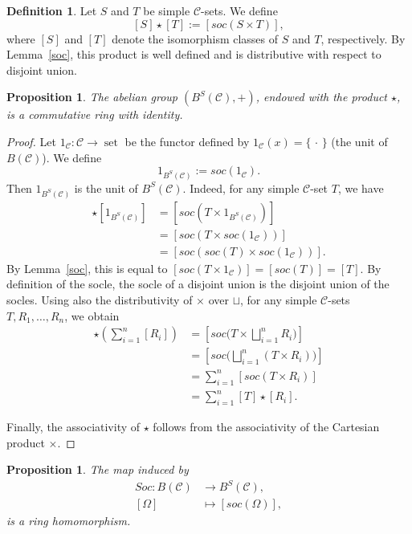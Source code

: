 \documentclass[a4paper]{article}
\newtheorem{prop}[thm]{Proposition}
\theoremstyle{definition}
\newtheorem{defi}[thm]{Definition}
\theoremstyle{remark}
\newcommand*{\cat}[1]{\mathcal{#1}}
\newcommand*{\set}{\operatorname*{set}}
\begin{document}
\begin{defi}
Let $S$ and $T$ be simple $\cat{C}$-sets. We define 
\[
    [S] \star [T] := [soc(S \times T)],
\]
where $[S]$ and $[T]$ denote the isomorphism classes of $S$ and $T$, respectively. By Lemma~\ref{soc}, this product is well defined and is distributive with respect to disjoint union.
\end{defi}
\begin{prop}
The abelian group $(B^{S}(\cat{C}),+)$, endowed with the product $\star$, is a commutative ring with identity.
\end{prop}
\begin{proof}
Let $1_\cat{C} \colon \cat{C} \to \set$ be the functor defined by $1_\cat{C}(x) = \{\, \cdot \,\}$ (the unit of $B(\cat{C})$). We define
\[
    1_{B^S(\cat{C})} := soc(1_\cat{C}).
\]
Then $1_{B^S(\cat{C})}$ is the unit of $B^S(\cat{C})$. Indeed, for any simple $\cat{C}$-set $T$, we have
\begin{align*}
    [T] \star [1_{B^S(\cat{C})}]
    &= [soc(T \times 1_{B^S(\cat{C})})] \\
    &= [soc(T \times soc(1_\cat{C}))] \\
    &= [soc(soc(T) \times soc(1_\cat{C}))].
\end{align*}
By Lemma~\ref{soc}, this is equal to
$[soc(T \times 1_\cat{C})] = [soc(T)] = [T].$
By definition of the socle, the socle of a disjoint union is the disjoint union of the socles. Using also the distributivity of $\times$ over $\sqcup$, for any simple $\cat{C}$-sets $T, R_1, \dots, R_n$, we obtain
\begin{align*}
    [T] \star \left( \sum_{i=1}^n [R_i] \right)
    &= [soc\bigl(T \times \bigsqcup_{i=1}^n R_i\bigr)] \\
    &= [soc\bigl(\bigsqcup_{i=1}^n (T \times R_i)\bigr)] \\
    &= \sum_{i=1}^n [soc(T \times R_i)] \\
    &= \sum_{i=1}^n [T] \star [R_i].
\end{align*}

Finally, the associativity of $\star$ follows from the associativity of the Cartesian product $\times$.
\end{proof}
\begin{prop}
The map induced  by 
\begin{align*}
   Soc \colon B(\cat{C}) &\longrightarrow B^S(\cat{C}),\\
    [\Omega] &\longmapsto [soc(\Omega)],
\end{align*}
is a ring homomorphism.
\end{prop}
\end{document}
